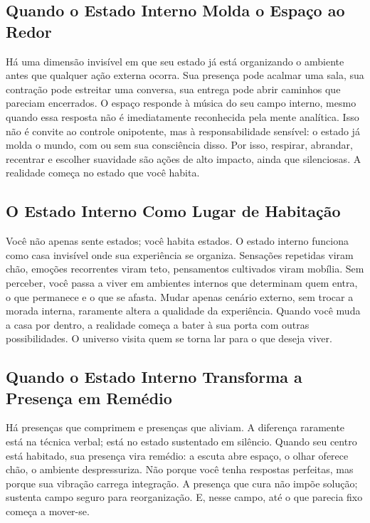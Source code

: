 \documentclass[12pt]{book}
\begin{document}
\subsection*{Quando o Estado Interno Molda o Espaço ao Redor}

Há uma dimensão invisível em que seu estado já está organizando o ambiente antes que qualquer ação externa ocorra. Sua presença pode acalmar uma sala, sua contração pode estreitar uma conversa, sua entrega pode abrir caminhos que pareciam encerrados. O espaço responde à música do seu campo interno, mesmo quando essa resposta não é imediatamente reconhecida pela mente analítica. Isso não é convite ao controle onipotente, mas à responsabilidade sensível: o estado já molda o mundo, com ou sem sua consciência disso. Por isso, respirar, abrandar, recentrar e escolher suavidade são ações de alto impacto, ainda que silenciosas. A realidade começa no estado que você habita.

\subsection*{O Estado Interno Como Lugar de Habitação}

Você não apenas sente estados; você habita estados. O estado interno funciona como casa invisível onde sua experiência se organiza. Sensações repetidas viram chão, emoções recorrentes viram teto, pensamentos cultivados viram mobília. Sem perceber, você passa a viver em ambientes internos que determinam quem entra, o que permanece e o que se afasta. Mudar apenas cenário externo, sem trocar a morada interna, raramente altera a qualidade da experiência. Quando você muda a casa por dentro, a realidade começa a bater à sua porta com outras possibilidades. O universo visita quem se torna lar para o que deseja viver.

\subsection*{Quando o Estado Interno Transforma a Presença em Remédio}

Há presenças que comprimem e presenças que aliviam. A diferença raramente está na técnica verbal; está no estado sustentado em silêncio. Quando seu centro está habitado, sua presença vira remédio: a escuta abre espaço, o olhar oferece chão, o ambiente despressuriza. Não porque você tenha respostas perfeitas, mas porque sua vibração carrega integração. A presença que cura não impõe solução; sustenta campo seguro para reorganização. E, nesse campo, até o que parecia fixo começa a mover-se.
\end{document}
